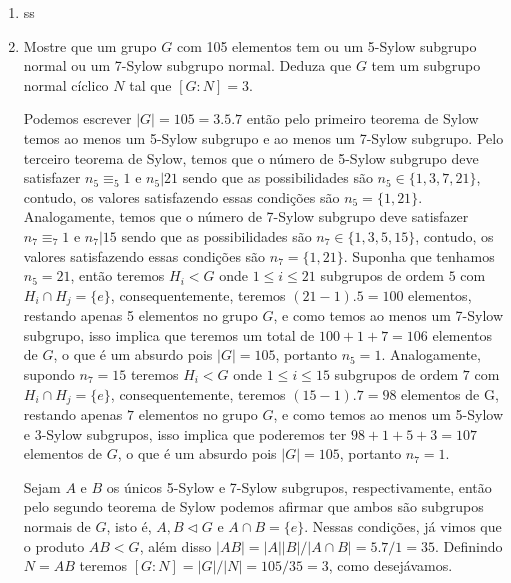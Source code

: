 \documentclass{article}
\begin{document}
\begin{enumerate}
		\item ss
		
		\item Mostre que um grupo $G$ com 105 elementos tem ou um 5-Sylow subgrupo normal ou um 7-Sylow subgrupo normal. Deduza que  $G$ tem um subgrupo normal cíclico $N$ tal que $[G:N] = 3$.
		
		Podemos escrever $|G| = 105 = 3.5.7$ então pelo primeiro teorema de Sylow temos ao menos um 5-Sylow subgrupo e ao menos um 7-Sylow subgrupo. Pelo terceiro teorema de Sylow, temos que o número de 5-Sylow subgrupo deve satisfazer $n_{5} \equiv_{5} 1$ e $n_{5} | 21$ sendo que as possibilidades são $n_{5} \in \{1, 3, 7, 21\}$, contudo, os valores satisfazendo essas condições são $n_{5} = \{1, 21\}$. Analogamente, temos que o número de 7-Sylow subgrupo deve satisfazer $n_{7} \equiv_{7} 1$ e $n_{7} | 15$ sendo que as possibilidades são $n_{7} \in \{1, 3, 5, 15\}$, contudo, os valores satisfazendo essas condições são $n_{7} = \{1, 21\}$. Suponha que tenhamos $n_{5} = 21$, então teremos $H_{i} < G$ onde $1 \leq i \leq 21$ subgrupos de ordem $5$ com $H_{i} \cap H_{j} = \{e\}$, consequentemente, teremos $(21-1).5 = 100$ elementos, restando apenas 5 elementos no grupo $G$, e como temos ao menos um 7-Sylow subgrupo, isso implica que teremos um total de $100 + 1 + 7 = 106$ elementos de $G$, o que é um absurdo pois $|G| = 105$, portanto $n_{5} = 1$. Analogamente, supondo $n_{7} = 15$ teremos $H_{i} <G$ onde $1 \leq i \leq 15$ subgrupos de ordem $7$ com $H_{i} \cap H_{j} = \{e\}$, consequentemente, teremos $(15-1).7 = 98$ elementos de G, restando apenas $7$ elementos no grupo $G$, e como temos ao menos um 5-Sylow e 3-Sylow subgrupos, isso implica que poderemos ter $98+1+5+3 = 107$ elementos de $G$, o que é um absurdo pois $|G| = 105$, portanto $n_{7} = 1$.
		
		Sejam $A$ e $B$ os únicos 5-Sylow e 7-Sylow subgrupos,  respectivamente, então pelo segundo teorema de Sylow podemos afirmar que ambos são subgrupos normais de $G$, isto é, $A, B \vartriangleleft G$ e $A \cap B = \{e\}$. Nessas condições, já vimos que o produto $AB < G$, além disso $|AB| = |A||B|/|A\cap B| = 5.7/1 = 35$. Definindo $N = AB$ teremos $[G:N] = |G|/|N| = 105/35 = 3$, como desejávamos.
	\end{enumerate}
	
	
\end{document}
